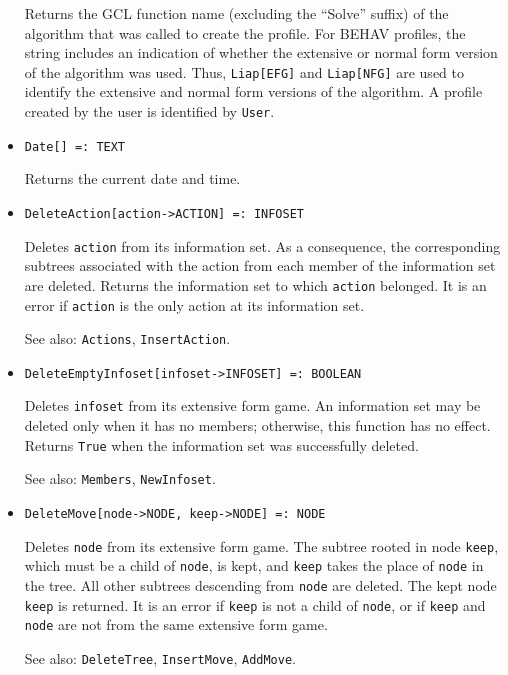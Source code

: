 \begin{itemize}
\bd 
Returns the GCL function name (excluding the ``Solve'' suffix) of
the algorithm that was called to create the profile. For
BEHAV profiles, the string includes an indication of whether the
extensive or normal form version of the algorithm was used.  Thus,
\verb+Liap[EFG]+ and \verb+Liap[NFG]+ are used to identify the
extensive and normal form versions of the algorithm.  A profile
created by the user is identified by \verb+User+.  
\ed


\item{}
\protect \large \begin{verbatim}
Date[] =: TEXT 
\end{verbatim}\normalsize

\bd
Returns the current date and time. 
\ed

\item{}
\protect \large \begin{verbatim}
DeleteAction[action->ACTION] =: INFOSET 
\end{verbatim}\normalsize

\bd
Deletes \verb+action+ from its information set. 
As a consequence, the corresponding subtrees associated
with the action from each member of the information set are deleted.
Returns the information set to which \verb+action+ belonged.  It is an
error if \verb+action+ is the only action at its information set.
\item [See also:] \verb+Actions+, \verb+InsertAction+.
\ed

\item{}
\protect \large \begin{verbatim}
DeleteEmptyInfoset[infoset->INFOSET] =: BOOLEAN 
\end{verbatim}\normalsize

\bd
Deletes \verb+infoset+ from its extensive form game.  An information set
may be deleted only when it has no members; otherwise, this function has
no effect.  Returns \verb+True+ when the information set was successfully
deleted.
\item [See also:] \verb+Members+, \verb+NewInfoset+.
\ed

\item{}
\protect \large \begin{verbatim}
DeleteMove[node->NODE, keep->NODE] =: NODE 
\end{verbatim}\normalsize

\bd
Deletes \verb+node+ from its extensive form game.  The
subtree rooted in node \verb+keep+, which must be a child of
\verb+node+, is kept, and \verb+keep+ takes the place of \verb+node+ in
the tree.  All other subtrees descending from \verb+node+ are deleted.
The kept node \verb+keep+ is returned.  It is an error if \verb+keep+
is not a child of \verb+node+, or if \verb+keep+ and \verb+node+ are not
from the same extensive form game.
\item [See also:] \verb+DeleteTree+, \verb+InsertMove+, \verb+AddMove+.
\ed


\end{itemize}
